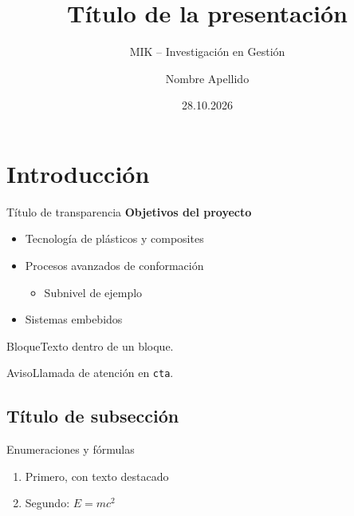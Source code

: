 \documentclass[aspectratio=169,11pt]{beamer}
\title{Título de la presentación}
\subtitle{MIK -- Investigación en Gestión}
\author{Nombre Apellido}
\date{28.10.2026}
\begin{document}
\begin{frame}[plain]
  \titlepage
\end{frame}

\section{Introducción}

\begin{frame}{Título de transparencia}
  \textbf{Objetivos del proyecto}
  \begin{itemize}
    \item Tecnología de plásticos y composites
    \item Procesos avanzados de conformación
    \begin{itemize}\item Subnivel de ejemplo\end{itemize}
    \item Sistemas embebidos
  \end{itemize}
  \begin{block}{Bloque}Texto dentro de un bloque.\end{block}
  \begin{alertblock}{Aviso}Llamada de atención en \texttt{cta}.\end{alertblock}
\end{frame}

\subsection{Título de subsección}

\begin{frame}{Enumeraciones y fórmulas}
  \begin{enumerate}
    \item Primero, con \alert{texto destacado}
    \item Segundo: $E = mc^2$
  \end{enumerate}
\end{frame}


\end{document}
